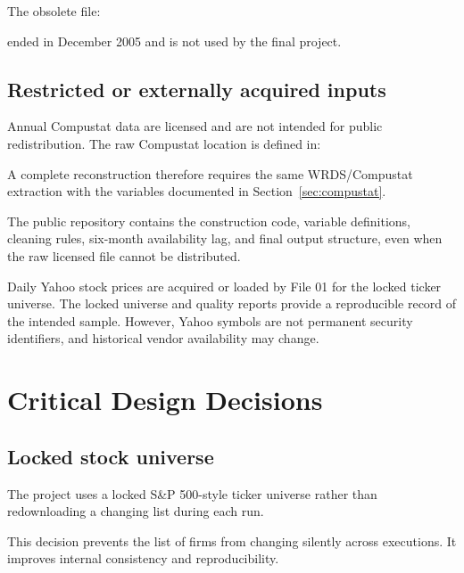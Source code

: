 \documentclass[11pt,a4paper]{article}
\begin{document}
The obsolete file:

\begin{center}
\end{center}

ended in December 2005 and is not used by the final project.

\subsection{Restricted or externally acquired inputs}

Annual Compustat data are licensed and are not intended for public
redistribution. The raw Compustat location is defined in:

\begin{center}
\end{center}

A complete reconstruction therefore requires the same WRDS/Compustat extraction
with the variables documented in Section~\ref{sec:compustat}.

The public repository contains the construction code, variable definitions,
cleaning rules, six-month availability lag, and final output structure, even
when the raw licensed file cannot be distributed.

Daily Yahoo stock prices are acquired or loaded by File 01 for the locked
ticker universe. The locked universe and quality reports provide a reproducible
record of the intended sample. However, Yahoo symbols are not permanent
security identifiers, and historical vendor availability may change.


\section{Critical Design Decisions}

\subsection{Locked stock universe}

The project uses a locked S\&P 500-style ticker universe rather than
redownloading a changing list during each run.

This decision prevents the list of firms from changing silently across
executions. It improves internal consistency and reproducibility.
\end{document}
